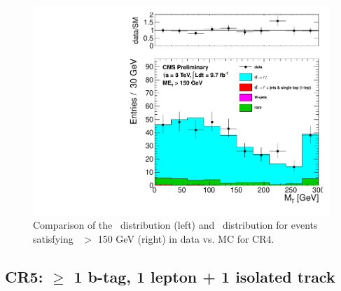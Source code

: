 \begin{figure}[hbt]
\begin{center}
\includegraphics[width=0.5\linewidth]{plots/pas_lin/mt_met150_nj4_emucomb_CR4.pdf}    
\caption{
Comparison of the \met\ distribution (left) and \mt\ distribution for events satisfying \met\ $>$ 150 GeV (right)
in data vs. MC for CR4. 
\label{fig:cr4met}} 
\end{center}
\end{figure} 
  
\clearpage

\subsection {CR5: $\ge$ 1 b-tag, 1 lepton + 1 isolated track}
\label{sec:CR5}


